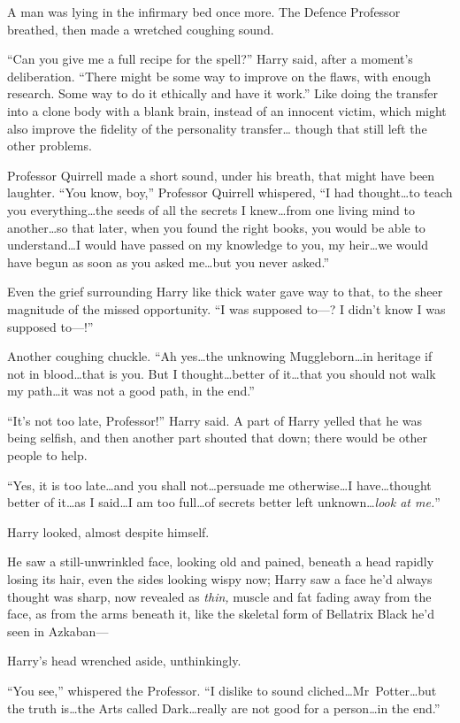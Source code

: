 A man was lying in the infirmary bed once more. The Defence Professor breathed, then made a wretched coughing sound.

“Can you give me a full recipe for the spell?” Harry said, after a moment’s deliberation. “There might be some way to improve on the flaws, with enough research. Some way to do it ethically and have it work.” Like doing the transfer into a clone body with a blank brain, instead of an innocent victim, which might also improve the fidelity of the personality transfer… though that still left the other problems.

Professor Quirrell made a short sound, under his breath, that might have been laughter. “You know, boy,” Professor Quirrell whispered, “I had thought…to teach you everything…the seeds of all the secrets I knew…from one living mind to another…so that later, when you found the right books, you would be able to understand…I would have passed on my knowledge to you, my heir…we would have begun as soon as you asked me…but you never asked.”

Even the grief surrounding Harry like thick water gave way to that, to the sheer magnitude of the missed opportunity. “I was supposed to—? I didn’t know I was supposed to—!”

Another coughing chuckle. “Ah yes…the unknowing Muggleborn…in heritage if not in blood…that is you. But I thought…better of it…that you should not walk my path…it was not a good path, in the end.”

“It’s not too late, Professor!” Harry said. A part of Harry yelled that he was being selfish, and then another part shouted that down; there would be other people to help.

“Yes, it is too late…and you shall not…persuade me
otherwise…I have…thought better of it…as I said…I
am too full…of secrets better left unknown…\emph{look at me.}”

Harry looked, almost despite himself.

He saw a still-unwrinkled face, looking old and pained, beneath a head rapidly losing its hair, even the sides looking wispy now; Harry saw a face he’d always thought was sharp, now revealed as \emph{thin,} muscle and fat fading away from the face, as from the arms beneath it, like the skeletal form of Bellatrix Black he’d seen in Azkaban—

Harry’s head wrenched aside, unthinkingly.

“You see,” whispered the Professor. “I dislike to sound cliched…Mr~Potter…but the truth is…the Arts called Dark…really are not good for a person…in the end.”

